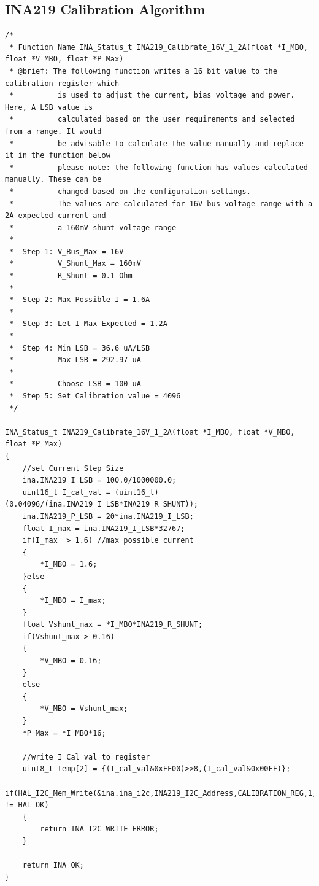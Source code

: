 \subsection{INA219 Calibration Algorithm}
    \begin{lstlisting}[breaklines=true]
/*
 * Function Name INA_Status_t INA219_Calibrate_16V_1_2A(float *I_MBO, float *V_MBO, float *P_Max)
 * @brief: The following function writes a 16 bit value to the calibration register which
 * 			is used to adjust the current, bias voltage and power. Here, A LSB value is
 * 			calculated based on the user requirements and selected from a range. It would
 * 			be advisable to calculate the value manually and replace it in the function below
 * 			please note: the following function has values calculated manually. These can be
 * 			changed based on the configuration settings.
 * 			The values are calculated for 16V bus voltage range with a 2A expected current and
 * 			a 160mV shunt voltage range
 *
 * 	Step 1: V_Bus_Max = 16V
 * 			V_Shunt_Max = 160mV
 * 			R_Shunt = 0.1 Ohm
 *
 * 	Step 2: Max Possible I = 1.6A
 *
 * 	Step 3: Let I Max Expected = 1.2A
 *
 * 	Step 4: Min LSB = 36.6 uA/LSB
 * 			Max LSB = 292.97 uA
 *
 * 			Choose LSB = 100 uA
 * 	Step 5: Set Calibration value = 4096
 */

INA_Status_t INA219_Calibrate_16V_1_2A(float *I_MBO, float *V_MBO, float *P_Max)
{
	//set Current Step Size
	ina.INA219_I_LSB = 100.0/1000000.0;
	uint16_t I_cal_val = (uint16_t)(0.04096/(ina.INA219_I_LSB*INA219_R_SHUNT));
	ina.INA219_P_LSB = 20*ina.INA219_I_LSB;
	float I_max = ina.INA219_I_LSB*32767;
	if(I_max  > 1.6) //max possible current
	{
		*I_MBO = 1.6;
	}else
	{
		*I_MBO = I_max;
	}
	float Vshunt_max = *I_MBO*INA219_R_SHUNT;
	if(Vshunt_max > 0.16)
	{
		*V_MBO = 0.16;
	}
	else
	{
		*V_MBO = Vshunt_max;
	}
	*P_Max = *I_MBO*16;

	//write I_Cal_val to register
	uint8_t temp[2] = {(I_cal_val&0xFF00)>>8,(I_cal_val&0x00FF)};
	if(HAL_I2C_Mem_Write(&ina.ina_i2c,INA219_I2C_Address,CALIBRATION_REG,1,temp,2,100) != HAL_OK)
	{
		return INA_I2C_WRITE_ERROR;
	}

	return INA_OK;
}

\end{lstlisting}
\begin{center}
\captionsetup{type=figure}
\label{fig:INA_Calib}
\end{center}

